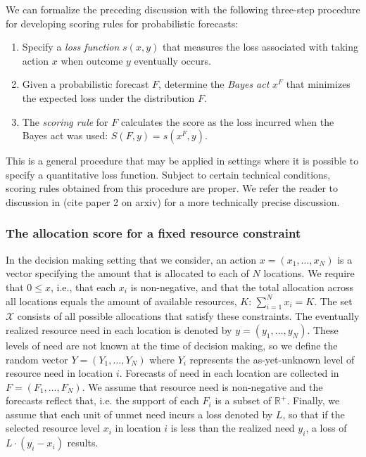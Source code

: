 \documentclass{article}\usepackage[]{graphicx}\usepackage[]{xcolor}
\def\elr#1{{\color{cyan}\textbf{ELR:[#1]}}}
\begin{document}
We can formalize the preceding discussion with the following three-step procedure for developing scoring rules for probabilistic forecasts:
\begin{enumerate}
\item Specify a \emph{loss function} $s(x, y)$ that measures the loss associated with taking action $x$ when outcome $y$ eventually occurs.
\item Given a probabilistic forecast $F$, determine the \emph{Bayes act} $x^F$ that minimizes the expected loss under the distribution $F$.
\item The \emph{scoring rule} for $F$ calculates the score as the loss incurred when the Bayes act was used: $S(F, y) = s(x^F, y)$.
\end{enumerate}
This is a general procedure that may be applied in settings where it is possible to specify a quantitative loss function. Subject to certain technical conditions, scoring rules obtained from this procedure are proper. We refer the reader to discussion in (cite paper 2 on arxiv) for a more technically precise discussion.




\subsubsection{The allocation score for a fixed resource constraint}
\label{sec:methods.detailed.specific_allocation}

In the decision making setting that we consider, an action $x = (x_1, \ldots, x_N)$ is a vector specifying the amount that is allocated to each of $N$ locations. We require that $0 \leq x$, i.e., that each $x_i$ is non-negative, and that the total allocation across all locations equals the amount of available resources, $K$: $\sum_{i=1}^N x_i = K$. The set $\mathcal{X}$ consists of all possible allocations that satisfy these constraints. The eventually realized resource need in each location is denoted by $y = (y_1, \ldots, y_N)$. These levels of need are not known at the time of decision making, so we define the random vector $Y = (Y_1, \ldots, Y_N)$ where $Y_i$ represents the as-yet-unknown level of resource need in location $i$. Forecasts of need in each location are collected in $F = (F_1, \ldots, F_N)$. We assume that resource need is non-negative and the forecasts reflect that, i.e. the support of each $F_i$ is a subset of $\mathbb{R}^+$. Finally, we assume that each unit of unmet need incurs a loss denoted by $L$, so that if the selected resource level $x_i$ in location $i$ is less than the realized need $y_i$, a loss of $L \cdot (y_i - x_i)$ results.
\end{document}
